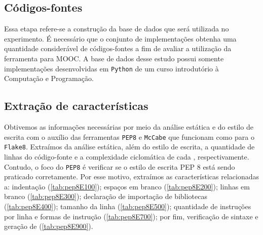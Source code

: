 		\subsection{Códigos-fontes}	
		
			Essa etapa refere-se a construção da base de dados que será utilizada no experimento.
			É necessário que o conjunto de implementações obtenha uma quantidade considerável de
			códigos-fontes a fim de avaliar a utilização da ferramenta para \acs{MOOC}. A
			base de dados desse estudo possui somente implementações desenvolvidas em \texttt{Python}
			de um curso introdutório à Computação e Programação.
			
		\subsection{Extração de características}
					
			Obtivemos as informações necessárias por meio da análise estática e do estilo de   
			escrita com o auxílio das ferramentas \texttt{PEP8} \cite{pep8} e \texttt{McCabe}
			\cite{mccabe} que funcionam como  para o \texttt{Flake8}.
			Extraímos da análise estática, além do estilo de escrita, a quantidade de linhas do código-fonte e a complexidade ciclomática de cada , respectivamente. Contudo, o
			foco do \texttt{PEP8} é verificar se o estilo de escrita PEP 8 \cite{van2001pep}
			está sendo praticado corretamente. Por esse motivo, extraímos as características
			relacionadas a: indentação (\cref{tab:pep8E100}); espaços em branco
			(\cref{tab:pep8E200}); linhas em branco (\cref{tab:pep8E300}); declaração de
			importação de bibliotecas (\cref{tab:pep8E400}); tamanho da linha (\cref{tab:pep8E500});
			quantidade de instruções por linha e formas de instrução (\cref{tab:pep8E700}); por fim,
			verificação de sintaxe e geração de  (\cref{tab:pep8E900}).
		
